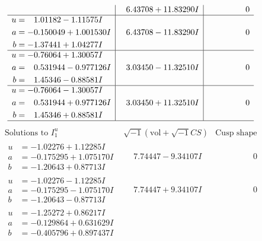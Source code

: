 \documentclass[1p]{elsarticle_modified}
\theoremstyle{definition}
\newcommand{\I}{\sqrt{-1}}
\begin{document}
$$\begin{array}{c|c|c}
 & \phantom{-}6.43708 + 11.83290 I & \phantom{-0.000000 } 0 \\ \hline\begin{aligned}
u &= \phantom{-}1.01182 - 1.11575 I \\
a &= -0.150049 + 1.001530 I \\
b &= -1.37441 + 1.04277 I\end{aligned}
 & \phantom{-}6.43708 - 11.83290 I & \phantom{-0.000000 } 0 \\ \hline\begin{aligned}
u &= -0.76064 + 1.30057 I \\
a &= \phantom{-}0.531944 - 0.977126 I \\
b &= \phantom{-}1.45346 - 0.88581 I\end{aligned}
 & \phantom{-}3.03450 - 11.32510 I & \phantom{-0.000000 } 0 \\ \hline\begin{aligned}
u &= -0.76064 - 1.30057 I \\
a &= \phantom{-}0.531944 + 0.977126 I \\
b &= \phantom{-}1.45346 + 0.88581 I\end{aligned}
 & \phantom{-}3.03450 + 11.32510 I & \phantom{-0.000000 } 0\\
 \hline 
 \end{array}$$\newpage$$\begin{array}{c|c|c}  
\text{Solutions to }I^u_{1}& \I (\text{vol} + \sqrt{-1}CS) & \text{Cusp shape}\\
 \hline 
\begin{aligned}
u &= -1.02276 + 1.12285 I \\
a &= -0.175295 + 1.075170 I \\
b &= -1.20643 + 0.87713 I\end{aligned}
 & \phantom{-}7.74447 - 9.34107 I & \phantom{-0.000000 } 0 \\ \hline\begin{aligned}
u &= -1.02276 - 1.12285 I \\
a &= -0.175295 - 1.075170 I \\
b &= -1.20643 - 0.87713 I\end{aligned}
 & \phantom{-}7.74447 + 9.34107 I & \phantom{-0.000000 } 0 \\ \hline\begin{aligned}
u &= -1.25272 + 0.86217 I \\
a &= -0.129864 + 0.631629 I \\
b &= -0.405796 + 0.897437 I\end{aligned}

\end{array}$$
\end{document}
